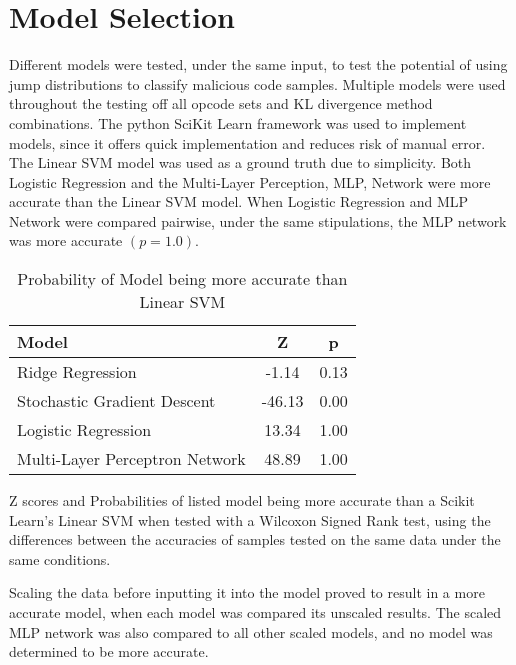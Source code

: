 
\section{Model Selection}

Different models were tested, under the same input, to test the potential of using jump distributions to classify
malicious code samples. Multiple models were used throughout the testing off all opcode sets and KL divergence
method combinations. The python SciKit Learn framework was used to implement models, since it offers quick
implementation and reduces risk of manual error. The Linear SVM model was used as a ground truth due to simplicity.
Both Logistic Regression and the Multi-Layer Perception, MLP, Network were more accurate than the Linear SVM model.
When Logistic Regression and MLP Network were compared pairwise, under the same stipulations, the MLP network was more
accurate $(p=1.0)$.

\begin{table}[H]
    \begin{center}
        \begin{tabular}{l|S|S}
            \textbf{Model} & \textbf{Z} & \textbf{p}\\
            \hline
            Ridge Regression & -1.14 & 0.13\\
            Stochastic Gradient Descent & -46.13 & 0.00\\
            Logistic Regression & 13.34 & 1.00\\
            Multi-Layer Perceptron Network & 48.89 & 1.00\\
        \end{tabular}
        \label{tab:table1}
        \caption{Probability of Model being more accurate than Linear SVM}
        \footnotesize{Z scores and Probabilities of listed model being more accurate than a Scikit Learn’s Linear SVM
        when tested with a Wilcoxon Signed Rank test, using the differences between the accuracies of samples tested on
        the same data under the same conditions.}

    \end{center}
\end{table}

Scaling the data before inputting it into the model proved to result in a more accurate model, when each model was
compared its unscaled results. The scaled MLP network was also compared to all other scaled models, and no model was
determined to be more accurate.

